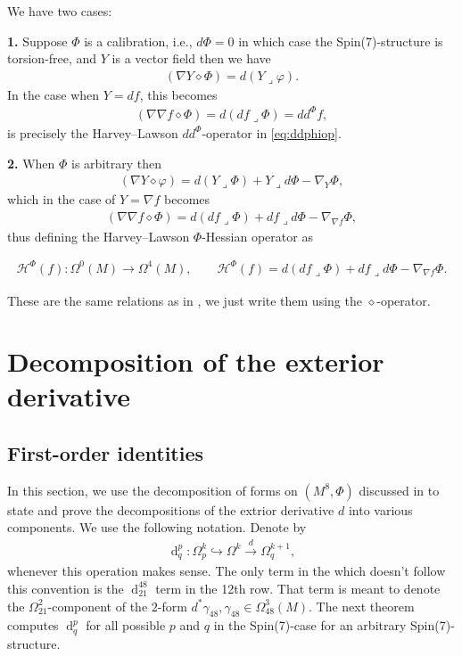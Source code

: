 \documentclass[10pt,a4paper,reqno]{article}
\theoremstyle{definition}
\numberwithin{equation}{section}
\DeclareMathOperator{\dd}{d}
\def\del{\nabla}
\def\g2{\varphi}
\def\ddphi{dd^{\Phi}}
\def\cH{\mathcal{H}}
\begin{document}
We have two cases:

\medskip

\noindent
{\bf{1.}} Suppose $\Phi$ is a calibration, i.e., $d\Phi=0$ in which case the Spin(7)-structure is torsion-free, and $Y$ is a vector field then we have
\begin{align}
(\del Y\diamond \Phi) = d(Y\lrcorner \g2).
\end{align}
In the case when $Y=df$, this becomes
\begin{align}
(\del \del f\diamond \Phi) = d(df\lrcorner \Phi) = \ddphi f,
\end{align}
is precisely the Harvey--Lawson $\ddphi$-operator in \cref{eq:ddphiop}.

\medspace

\noindent
{\bf{2.}} When $\Phi$ is arbitrary then 
\begin{align}
(\del Y\diamond \g2) = d(Y\lrcorner \Phi)+Y\lrcorner d\Phi - \del_{Y}\Phi,
\end{align}
which in the case of $Y=\del f$ becomes
\begin{align}
(\del \del f \diamond \Phi)= d(df\lrcorner \Phi)+ df\lrcorner d\Phi - \del_{\del f}\Phi,
\end{align}
thus defining the Harvey--Lawson $\Phi$-Hessian operator as

\begin{align}\label{eq:hlhessiangeneral}
\cH^{\Phi}(f):\Omega^0(M) \rightarrow \Omega^4(M), \qquad \cH^{\Phi}(f) =  d(df\lrcorner \Phi)+ df\lrcorner d\Phi - \del_{\del f}\Phi.
\end{align}

These are the same relations as in \cite[]{HL-intropotential}, we just write them using the $\diamond$-operator.


\section{Decomposition of the exterior derivative}\label{sec:decompositionofd}

\subsection{First-order identities}

In this section, we use the decomposition of forms on $(M^8, \Phi)$ discussed in  to state and prove the decompositions of the extrior derivative $d$ into various components. We use the following notation. Denote by
\begin{align}
\dd^p_q:\Omega^k_p\hookrightarrow \Omega^k \xrightarrow{d} \Omega^{k+1}_q,
\end{align}
whenever this operation makes sense. The only term in the  which doesn't follow this convention is the $\dd^{48}_{21}$ term in the 12th row. That term is meant to denote the $\Omega^2_{21}$-component of the $2$-form $d^*\gamma_{48}, \gamma_{48}\in \Omega^3_{48}(M)$. The next theorem computes $\dd^{p}_q$ for all possible $p$ and $q$ in the Spin(7)-case for an arbitrary Spin(7)-structure. 
\end{document}
